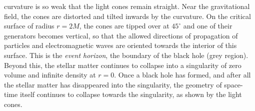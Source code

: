 \documentclass{lamuphys}
\begin{document}
curvature is so weak that the light cones remain straight. Near the
gravitational field, the cones are distorted and tilted inwards by the curvature. On
the critical surface of radius $r=2M$, the cones are tipped over at 
$45^{\circ}$
and one of their generators becomes vertical, so that the allowed directions of
propagation of particles and electromagnetic waves are oriented towards 
the interior of this surface. This is the {\it event horizon}, the boundary of the
black hole (grey region). Beyond this, the stellar matter continues to
collapse into a singularity of zero volume and infinite density at $r=0$. Once
a black hole has formed, and after all the stellar matter has disappeared into
the singularity, the geometry of space-time itself continues to collapse
towards the singularity, as shown by the light cones. 
\end{document}

